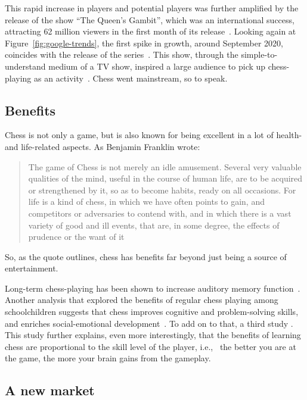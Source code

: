 This rapid increase in players and potential players was further amplified by the release of the show ``The Queen's
Gambit'', which was an international success, attracting 62 million viewers in the first month of its
release~\cite{deadline2020}.
Looking again at Figure~\ref{fig:google-trends}, the first spike in growth, around September 2020, coincides with the
release of the series~\cite{nyt2022}.
This show, through the simple-to-understand medium of a TV show, inspired a large audience to pick up chess-playing as
an activity~\cite{polygon2023}.
Chess went mainstream, so to speak.

\subsection{Benefits}\label{subsec:benefits}

Chess is not only a game, but is also known for being excellent in a lot of health- and life-related aspects.
As Benjamin Franklin wrote: \blockcquote{franklin1786}{The game of Chess is not merely an idle amusement. Several very
valuable qualities of the mind, useful in the course of human life, are to be acquired or strengthened by it, so as to
become habits, ready on all occasions. For life is a kind of chess, in which we have often points to gain, and
competitors or adversaries to contend with, and in which there is a vast variety of good and ill events, that are, in
some degree, the effects of prudence or the want of it}.

So, as the quote outlines, chess has benefits far beyond just being a source of entertainment.

Long-term chess-playing has been shown to increase auditory memory function~\cite{fattahi2015}.
Another analysis that explored the benefits of regular chess playing among schoolchildren suggests that chess improves
cognitive and problem-solving skills, and enriches social-emotional development~\cite{aciego2012}.
To add on to that, a third study .
This study further explains, even more interestingly, that the benefits of learning chess are proportional to the skill
level of the player, i.e., \ the better you are at the game, the more your brain gains from the gameplay.

\subsection{A new market}\label{subsec:a-new-market}

